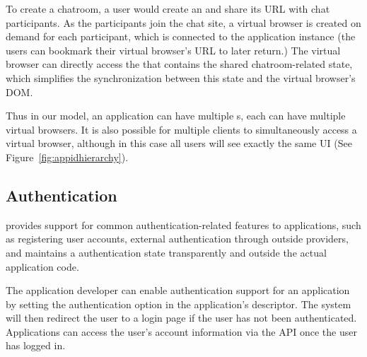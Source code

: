 To create a chatroom, a user would create an \appins{} and share
its URL with chat participants. As the participants join the chat site, a
virtual browser is created on demand for each participant, which is connected
to the application instance (the users can bookmark their virtual browser's
URL to later return.) The virtual browser can directly access the \appins
that contains the shared chatroom-related state, which simplifies the 
synchronization between this state and the virtual browser's DOM.

\apphierarchyfig{}

Thus in our model, 
an application can have multiple \appins{}s,
each \appins{} can have multiple virtual browsers.
It is also possible for multiple clients to simultaneously access a virtual browser,
although in this case all users will see exactly the same UI 
(See Figure~\ref{fig:appidhierarchy}).






\subsection{Authentication}
\label{sec:auth}

\cb provides support for common authentication-related features
to applications, such as registering user accounts, external authentication
through outside providers, and maintains a authentication state transparently
and outside the actual application code.

The application developer can enable authentication support for an
application by setting the authentication option in the application's descriptor.
The system will then redirect the user to a login page if the
user has not been authenticated.
Applications can access the user's account information via the \cb API 
once the user has logged in.

